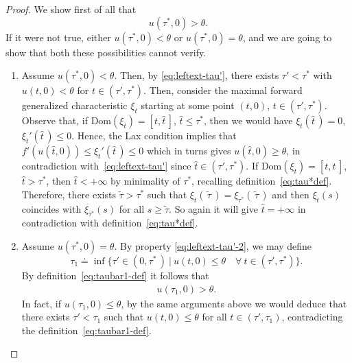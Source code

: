 \documentclass[a4paper, 10pt, final]{article}
\begin{document}
\begin{proof}
  We show first of all  that
  \begin{equation}\label{utau8}
      u(\tau^*,0)>\theta.
  \end{equation}
  If it were not true,  either 
  $u(\tau^*,0)<\theta$ or $u(\tau^*,0)=\theta$, and we are going to show that both these possibilities cannot verify. 
  \begin{enumerate}
      \item Assume $u(\tau^*,0)<\theta$.
      Then, by \eqref{eq:leftext-tau'}, there exists $\tau'<\tau^*$ 
  with $u(t,0)< \theta$ for $t\in(\tau', \tau^*)$. 
  Then, consider the maximal forward generalized characteristic
  $\xi_t$ starting at some point
  $(t,0)$, $t\in (\tau', \tau^*)$.
  Observe that, if $\text{Dom}(\xi_t)=[t, \hat t\,]$, $\hat t\leq \tau^*$, 
  then we would have $\xi_t(\hat t\,)= 0$, \, $\xi_t'(\hat t\,)\leq 0$.
  Hence,   the Lax condition  implies that  $f'(u(\hat t,0))\leq \xi_t'(\hat t\,)\leq 0$
  which in turns gives  $u(\hat t,0)\geq \theta$,
  in contradiction with~\eqref{eq:leftext-tau'} since $\hat t \in (\tau', \tau^*)$.
  If $\text{Dom}(\xi_t)=[t, \hat t\,]$, $\hat t> \tau^*$, then 
  $\hat t<+\infty$ by minimality of $\tau^*$, recalling definition~\eqref{eq:tau*def}. 
  Therefore,  there exists 
  $\widetilde{\tau}>\tau^*$ such that
  $\xi_t(\,\widetilde{\tau }\,)=\xi_{\tau^*}(\,\widetilde{\tau }\,)$ and then  $\xi_t(s)$ coincides with $\xi_{\tau^*}(s)$
  for all $s\geq \widetilde{\tau }$. So    again it will give $\hat t = +\infty$ in contradiction with definition~\eqref{eq:tau*def}.
    \item Assume  $u(\tau^*,0)=\theta$.
      By property \eqref{eq:leftext-tau'-2},  we may  define
  \begin{equation}
  \label{eq:taubar1-def}
      {\tau}_1\doteq\inf\Big\{
      \tau'\in (0,\tau^*\,)
      ~\big|~ 
      u(t,0)\leq \theta\quad\forall~t\in(\tau', \tau^*)
      \Big\}.
  \end{equation}
  By definition~\eqref{eq:taubar1-def} it follows that 
  \begin{eqnarray}
  \label{eq:tau1-ineq1}
      u({\tau}_1,0)>\theta.
  \end{eqnarray}
  In fact, if 
  $u({\tau}_1,0)\leq \theta$, by the same arguments above we would deduce that there exists ${\tau}'<{\tau}_1$
  such that $u(t,0)\leq \theta$ for all $t\in ({\tau}', {\tau}_1)$, contradicting the definition~\eqref{eq:taubar1-def}. 

\end{enumerate}
\end{proof}
\end{document}
